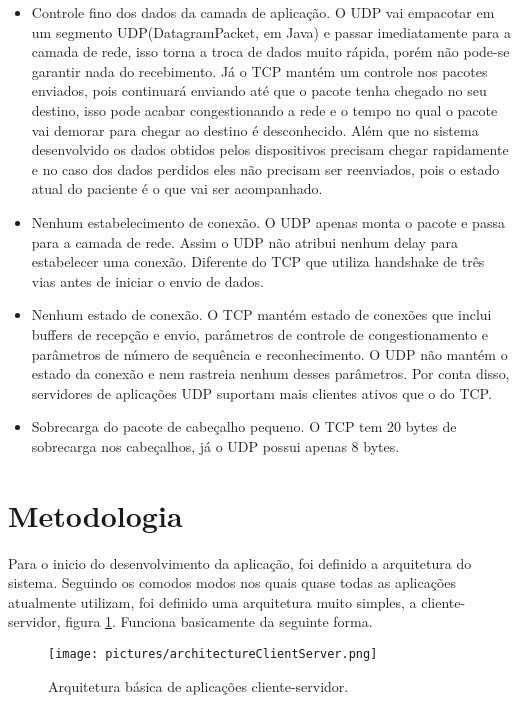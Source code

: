 \documentclass[12pt]{article}
\begin{document}
\begin{itemize}
\item Controle fino dos dados da camada de aplicação. O UDP vai empacotar em um segmento UDP(DatagramPacket, em Java) e passar imediatamente para a camada de rede, isso torna a troca de dados muito rápida, porém não pode-se garantir nada do recebimento. Já o TCP mantém um controle nos pacotes enviados, pois continuará enviando até que o pacote tenha chegado no seu destino, isso pode acabar congestionando a rede e o tempo no qual o pacote vai demorar para chegar ao destino é desconhecido. Além que no sistema desenvolvido os dados obtidos pelos dispositivos precisam chegar rapidamente e no caso dos dados perdidos eles não precisam ser reenviados, pois o estado atual do paciente é o que vai ser acompanhado.

\item Nenhum estabelecimento de conexão. O UDP apenas monta o pacote e passa para a camada de rede. Assim o UDP não atribui nenhum delay para estabelecer uma conexão. Diferente do TCP que utiliza handshake de três vias antes de iniciar o envio de dados.

\item Nenhum estado de conexão. O TCP mantém estado de conexões que inclui buffers de recepção e envio, parâmetros de controle de congestionamento e parâmetros de número de sequência e reconhecimento\cite{kurose2005computer}. O UDP não mantém o estado da conexão e nem rastreia nenhum desses parâmetros. Por conta disso, servidores de aplicações UDP suportam mais clientes ativos que o do TCP.

\item Sobrecarga do pacote de cabeçalho pequeno. O TCP tem 20 bytes de sobrecarga nos cabeçalhos, já o UDP possui apenas 8 bytes.
\end{itemize}

\section{Metodologia}

Para o inicio do desenvolvimento da aplicação, foi definido a arquitetura do sistema. Seguindo os comodos modos nos quais quase todas as aplicações atualmente utilizam, foi definido uma arquitetura muito simples, a cliente-servidor, figura \ref{archClientServer}. Funciona basicamente da seguinte forma.

\begin{figure}[!htb]
\centering
\texttt{[image: pictures/architectureClientServer.png]}
\caption{Arquitetura básica de aplicações cliente-servidor.}
\label{archClientServer}
\end{figure}
\end{document}
